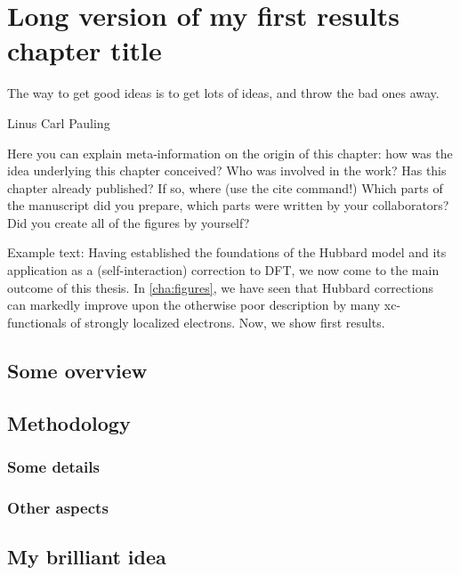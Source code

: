 \chapter[My first results chapter]{Long version of my first results chapter title}
    \label{cha:first-results}

\epigraph{%
    The way to get good ideas is to get lots of ideas, and throw the bad ones away.}
    {Linus Carl Pauling}

\begin{remarks}
        Here you can explain meta-information on the origin of this chapter: how was the idea underlying this chapter conceived? Who was involved in the work?
        Has this chapter already published? If so, where (use the cite command!)
        Which parts of the manuscript did you prepare, which parts were written by your collaborators?
        Did you create all of the figures by yourself?
\end{remarks}

%
\noindent Example text: Having established the foundations of the Hubbard model and its application as a (self-interaction) correction to \ac{DFT}, we now come to the main outcome of this thesis. 
%
In \cref{cha:figures}, we have seen that Hubbard corrections can markedly improve upon the otherwise poor description by many xc-functionals of strongly localized electrons.
%
Now, we show first results.

\section{Some overview}
    \label{sec:first-overview}

\section{Methodology}
    \label{sec:first-methodology}
    \subsection{Some details}
        \label{subsec:first-details}
    \subsection{Other aspects}
        \label{subsec:first-aspects}

\section{My brilliant idea}
    \label{sec:first-idea}